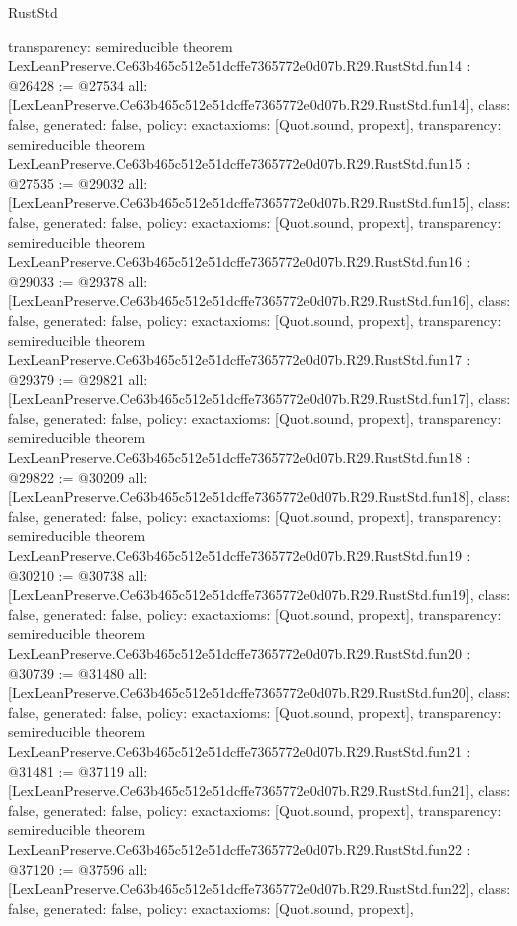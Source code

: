\begin{lexlean}{RustStd}
\begin{coremodule}
{  transparency: semireducible
}
theorem LexLeanPreserve.Ce63b465c512e51dcffe7365772e0d07b.R29.RustStd.fun14 : @26428 := @27534 {
  all: [LexLeanPreserve.Ce63b465c512e51dcffe7365772e0d07b.R29.RustStd.fun14],
  class: false,
  generated: false,
  policy: exact{axioms: [Quot.sound, propext]},
  transparency: semireducible
}
theorem LexLeanPreserve.Ce63b465c512e51dcffe7365772e0d07b.R29.RustStd.fun15 : @27535 := @29032 {
  all: [LexLeanPreserve.Ce63b465c512e51dcffe7365772e0d07b.R29.RustStd.fun15],
  class: false,
  generated: false,
  policy: exact{axioms: [Quot.sound, propext]},
  transparency: semireducible
}
theorem LexLeanPreserve.Ce63b465c512e51dcffe7365772e0d07b.R29.RustStd.fun16 : @29033 := @29378 {
  all: [LexLeanPreserve.Ce63b465c512e51dcffe7365772e0d07b.R29.RustStd.fun16],
  class: false,
  generated: false,
  policy: exact{axioms: [Quot.sound, propext]},
  transparency: semireducible
}
theorem LexLeanPreserve.Ce63b465c512e51dcffe7365772e0d07b.R29.RustStd.fun17 : @29379 := @29821 {
  all: [LexLeanPreserve.Ce63b465c512e51dcffe7365772e0d07b.R29.RustStd.fun17],
  class: false,
  generated: false,
  policy: exact{axioms: [Quot.sound, propext]},
  transparency: semireducible
}
theorem LexLeanPreserve.Ce63b465c512e51dcffe7365772e0d07b.R29.RustStd.fun18 : @29822 := @30209 {
  all: [LexLeanPreserve.Ce63b465c512e51dcffe7365772e0d07b.R29.RustStd.fun18],
  class: false,
  generated: false,
  policy: exact{axioms: [Quot.sound, propext]},
  transparency: semireducible
}
theorem LexLeanPreserve.Ce63b465c512e51dcffe7365772e0d07b.R29.RustStd.fun19 : @30210 := @30738 {
  all: [LexLeanPreserve.Ce63b465c512e51dcffe7365772e0d07b.R29.RustStd.fun19],
  class: false,
  generated: false,
  policy: exact{axioms: [Quot.sound, propext]},
  transparency: semireducible
}
theorem LexLeanPreserve.Ce63b465c512e51dcffe7365772e0d07b.R29.RustStd.fun20 : @30739 := @31480 {
  all: [LexLeanPreserve.Ce63b465c512e51dcffe7365772e0d07b.R29.RustStd.fun20],
  class: false,
  generated: false,
  policy: exact{axioms: [Quot.sound, propext]},
  transparency: semireducible
}
theorem LexLeanPreserve.Ce63b465c512e51dcffe7365772e0d07b.R29.RustStd.fun21 : @31481 := @37119 {
  all: [LexLeanPreserve.Ce63b465c512e51dcffe7365772e0d07b.R29.RustStd.fun21],
  class: false,
  generated: false,
  policy: exact{axioms: [Quot.sound, propext]},
  transparency: semireducible
}
theorem LexLeanPreserve.Ce63b465c512e51dcffe7365772e0d07b.R29.RustStd.fun22 : @37120 := @37596 {
  all: [LexLeanPreserve.Ce63b465c512e51dcffe7365772e0d07b.R29.RustStd.fun22],
  class: false,
  generated: false,
  policy: exact{axioms: [Quot.sound, propext]},
}
\end{coremodule}
\end{lexlean}
